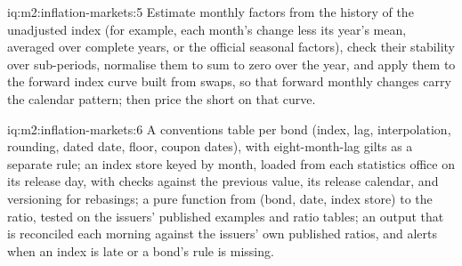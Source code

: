 \begin{solution}{iq:m2:inflation-markets:5}
Estimate monthly factors from the history of the unadjusted index (for example,
each month's change less its year's mean, averaged over complete years, or the
official seasonal factors), check their stability over sub-periods, normalise
them to sum to zero over the year, and apply them to the forward index curve
built from swaps, so that forward monthly changes carry the calendar pattern;
then price the short  on that curve.
\end{solution}

\begin{solution}{iq:m2:inflation-markets:6}
A conventions table per bond (index, lag, interpolation, rounding, dated date,
floor, coupon dates), with eight-month-lag gilts as a separate rule; an index
store keyed by month, loaded from each statistics office on its release day,
with checks against the previous value, its release calendar, and versioning
for rebasings; a pure function from (bond, date, index store) to the ratio,
tested on the issuers' published examples and ratio tables; an output that is
reconciled each morning against the issuers' own published ratios, and alerts
when an index is late or a bond's rule is missing.
\end{solution}

